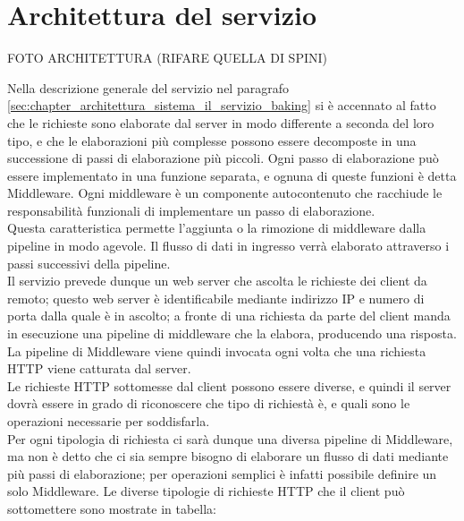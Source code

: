 \section{Architettura del servizio}
\label{sec:chapter_baking_service_architettura_servizio}

FOTO ARCHITETTURA (RIFARE QUELLA DI SPINI)

Nella descrizione generale del servizio nel paragrafo \ref{sec:chapter_architettura_sistema_il_servizio_baking} si è accennato al fatto che le richieste sono elaborate dal server in modo differente a seconda del loro tipo, e che le elaborazioni più complesse possono essere decomposte in una successione di passi di elaborazione più piccoli. Ogni passo di elaborazione può essere implementato in una funzione separata, e ognuna di queste funzioni è detta Middleware. Ogni middleware è un componente autocontenuto che racchiude le responsabilità funzionali di implementare un passo di elaborazione.
\\
Questa caratteristica permette l’aggiunta o la rimozione di middleware dalla pipeline in modo agevole. Il flusso di dati in ingresso verrà elaborato attraverso i passi successivi della pipeline. 
\\
Il servizio prevede dunque un web server che ascolta le richieste dei client da remoto; questo web server è identificabile mediante indirizzo IP e numero di porta dalla quale è in ascolto; a fronte di una richiesta da parte del client manda in esecuzione una pipeline di middleware che la elabora, producendo una risposta. La pipeline di Middleware viene quindi invocata ogni volta che una richiesta HTTP viene catturata dal server. 
\\
Le richieste HTTP sottomesse dal client possono essere diverse, e quindi il server dovrà essere in grado di riconoscere che tipo di richiestà è, e quali sono le operazioni necessarie per soddisfarla. 
\\
Per ogni tipologia di richiesta ci sarà dunque una diversa pipeline di Middleware, ma non è detto che ci sia sempre bisogno di elaborare un flusso di dati mediante più passi di elaborazione; per operazioni semplici è infatti possibile definire un solo Middleware. 
Le diverse tipologie di richieste HTTP che il client può sottomettere sono mostrate in tabella:
